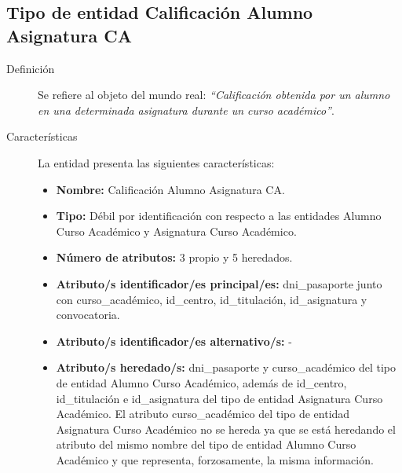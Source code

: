 \subsection{Tipo de entidad Calificación Alumno Asignatura CA}

   \begin{description}

   \item[Definición] Se refiere al objeto del mundo real: \emph{``Calificación
   obtenida por un alumno en una determinada asignatura durante un curso
   académico''}.

   \item[Características] La entidad presenta las siguientes características:
      \begin{itemize}
         \item \textbf{Nombre:} Calificación Alumno Asignatura CA.
         \item \textbf{Tipo:} Débil por identificación con respecto a las
         entidades Alumno Curso Académico y Asignatura Curso Académico.
         \item \textbf{Número de atributos:} 3 propio y 5 heredados.
         \item \textbf{Atributo/s identificador/es principal/es:} dni\_pasaporte
         junto con curso\_académico, id\_centro, id\_titulación, id\_asignatura
         y convocatoria.
         \item \textbf{Atributo/s identificador/es alternativo/s:} -
         \item \textbf{Atributo/s heredado/s:} dni\_pasaporte y curso\_académico del
         tipo de entidad Alumno Curso Académico, además de id\_centro, id\_titulación
         e id\_asignatura del tipo de entidad Asignatura Curso Académico. El atributo
         curso\_académico del tipo de entidad Asignatura Curso Académico no se hereda
         ya que se está heredando el atributo del mismo nombre del tipo de entidad
         Alumno Curso Académico y que representa, forzosamente, la misma información.
      \end{itemize}


\end{description}
